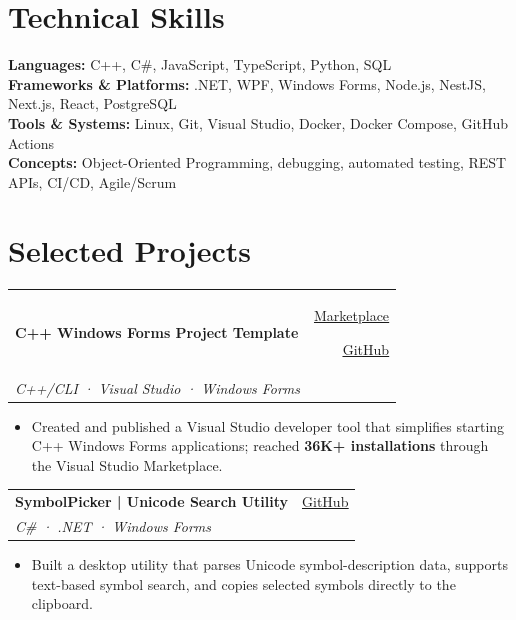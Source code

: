 \documentclass[10pt,a4paper]{article}
\makeatletter
\newcommand{\cvlink}[2]{\href{#1}{\uline{#2}}}
\newcommand{\linksep}{
    \hspace{0.35em}{\small\textbullet}\hspace{0.35em}
}
\newcommand{\project}[3]{
\begin{tabularx}{\textwidth}{@{}Xr@{}}
    \textbf{#1} & {\small #3} \\[-0.5pt]
    {\small\textit{#2}} & {}
\end{tabularx}
\vspace{-1pt}
}
\makeatother
\begin{document}

\section{Technical Skills}

{\small
\textbf{Languages:}
C++, C\#, JavaScript, TypeScript, Python, SQL
\\[1.5pt]
\textbf{Frameworks \& Platforms:}
.NET, WPF, Windows Forms, Node.js, NestJS, Next.js, React, PostgreSQL
\\[1.5pt]
\textbf{Tools \& Systems:}
Linux, Git, Visual Studio, Docker, Docker Compose, GitHub Actions
\\[1.5pt]
\textbf{Concepts:}
Object-Oriented Programming, debugging, automated testing, REST APIs, CI/CD, Agile/Scrum
}


\section{Selected Projects}


\project
{C++ Windows Forms Project Template}
{C++/CLI · Visual Studio · Windows Forms}
{
\cvlink
{https://marketplace.visualstudio.com/items?itemName=Sciber.cppwinformsproject}
{Marketplace}
\linksep
\cvlink
{https://github.com/thisismalindu/CppWinFormsProjectTemplate}
{GitHub}
}

\begin{itemize}
\item Created and published a Visual Studio developer tool that simplifies
starting C++ Windows Forms applications; reached \textbf{36K+ installations}
through the Visual Studio Marketplace.
\end{itemize}

\vspace{1pt}


\project
{SymbolPicker | Unicode Search Utility}
{C\# · .NET · Windows Forms}
{\cvlink{https://github.com/thisismalindu/SymbolPicker}{GitHub}}

\begin{itemize}
\item Built a desktop utility that parses Unicode symbol-description data,
supports text-based symbol search, and copies selected symbols directly to
the clipboard.
\end{itemize}
\end{document}
